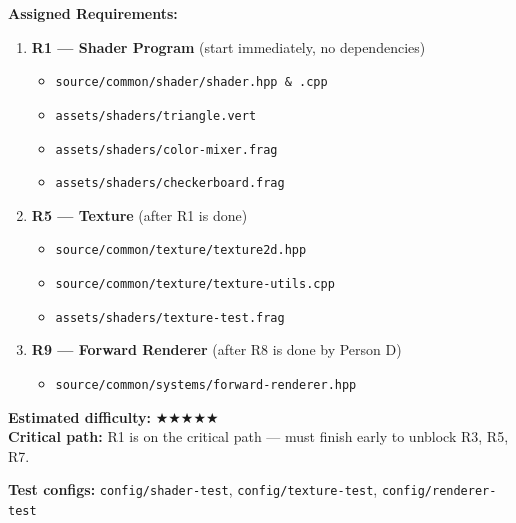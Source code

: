 \documentclass[12pt,a4paper]{article}
\begin{document}
\begin{center}
\end{center}

\vspace{0.3cm}

\begin{tcolorbox}[
  colback=personA!8, colframe=personA, title={\textbf{Person A} --- Shader + Texture + Forward Renderer},
  fonttitle=\bfseries\color{white}, coltitle=white
]
\textbf{Assigned Requirements:}
\begin{enumerate}[nosep]
  \item \textbf{R1 --- Shader Program} (start immediately, no dependencies)
    \begin{itemize}[nosep]
      \item \texttt{source/common/shader/shader.hpp \& .cpp}
      \item \texttt{assets/shaders/triangle.vert}
      \item \texttt{assets/shaders/color-mixer.frag}
      \item \texttt{assets/shaders/checkerboard.frag}
    \end{itemize}
  \item \textbf{R5 --- Texture} (after R1 is done)
    \begin{itemize}[nosep]
      \item \texttt{source/common/texture/texture2d.hpp}
      \item \texttt{source/common/texture/texture-utils.cpp}
      \item \texttt{assets/shaders/texture-test.frag}
    \end{itemize}
  \item \textbf{R9 --- Forward Renderer} (after R8 is done by Person D)
    \begin{itemize}[nosep]
      \item \texttt{source/common/systems/forward-renderer.hpp}
    \end{itemize}
\end{enumerate}

\textbf{Estimated difficulty:} {\Large$\bigstar\bigstar\bigstar\bigstar$}$\bigstar$ \\
\textbf{Critical path:} R1 is on the critical path --- must finish early to unblock R3, R5, R7.

\textbf{Test configs:} \texttt{config/shader-test}, \texttt{config/texture-test}, \texttt{config/renderer-test}
\end{tcolorbox}
\end{document}
